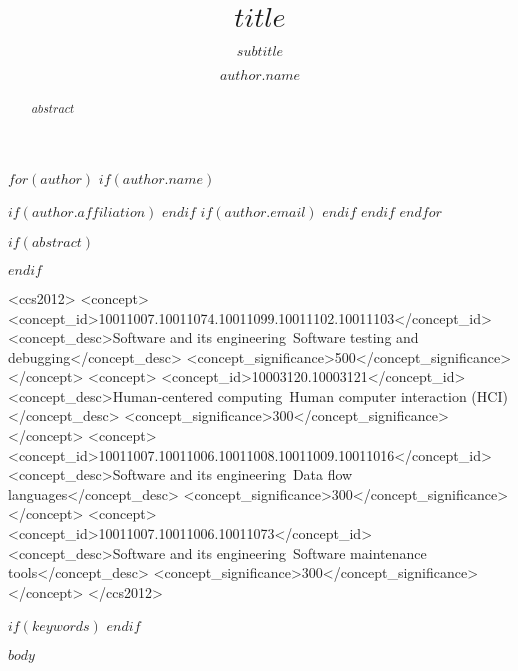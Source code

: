 \documentclass[sigplan,screen,$for(classoption)$$classoption$$sep$,$endfor$]{$documentclass$}
\title{$title$}
\subtitle{$subtitle$}
\begin{document}
$for(author)$
	$if(author.name)$
		\author{$author.name$}
		$if(author.affiliation)$
		$endif$
		$if(author.email)$
		$endif$
	$endif$
$endfor$

$if(abstract)$
\begin{abstract}
$abstract$
\end{abstract}
$endif$

\begin{CCSXML}
<ccs2012>
    <concept>
        <concept_id>10011007.10011074.10011099.10011102.10011103</concept_id>
        <concept_desc>Software and its engineering~Software testing and debugging</concept_desc>
        <concept_significance>500</concept_significance>
        </concept>
    <concept>
        <concept_id>10003120.10003121</concept_id>
        <concept_desc>Human-centered computing~Human computer interaction (HCI)</concept_desc>
        <concept_significance>300</concept_significance>
        </concept>
    <concept>
        <concept_id>10011007.10011006.10011008.10011009.10011016</concept_id>
        <concept_desc>Software and its engineering~Data flow languages</concept_desc>
        <concept_significance>300</concept_significance>
        </concept>
    <concept>
        <concept_id>10011007.10011006.10011073</concept_id>
        <concept_desc>Software and its engineering~Software maintenance tools</concept_desc>
        <concept_significance>300</concept_significance>
        </concept>
  </ccs2012>
\end{CCSXML}


$if(keywords)$
$endif$

\maketitle

$body$
\end{document}

